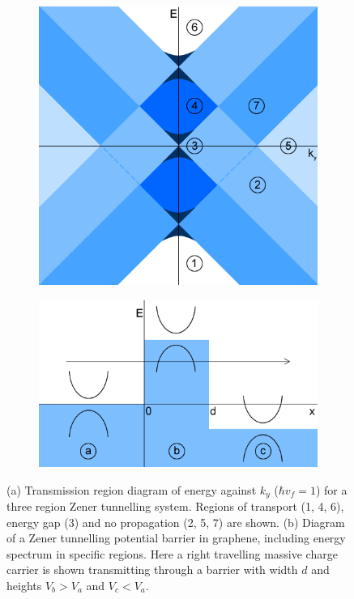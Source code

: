 	\begin{figure}[h]
		 \begin{subfigure}[h]{0.5\textwidth}
			\centerline{\includegraphics[scale=0.45]{images/asy-regions-flat}}
			\caption{}
		\end{subfigure}
		\hspace{0.5cm}
		\begin{subfigure}[h]{0.5\textwidth}
			\centerline{\includegraphics[scale=0.45]{images/asy-flat}}
			\caption{}
		\end{subfigure}
		\caption{(a) Transmission region diagram of energy against $k_{y}$ ($\hbar v_{f}=1$) for a three region Zener tunnelling system. Regions of transport (1, 4, 6), energy gap (3) and no propagation (2, 5, 7) are shown. (b) Diagram of a Zener tunnelling potential barrier in graphene, including energy spectrum in specific regions. Here a right travelling massive charge carrier is shown transmitting through a barrier with width $d$ and heights $V_{b}>V_{a}$ and $V_{c}<V_{a}$.}
		\label{asy-regions-flat}
	\end{figure}

